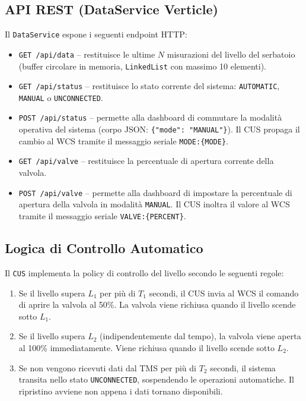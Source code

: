 \documentclass[12pt, a4paper]{article}
\begin{document}
\subsection{API REST (DataService Verticle)}

Il \texttt{DataService} espone i seguenti endpoint HTTP:

\begin{itemize}
    \item \texttt{GET /api/data} -- restituisce le ultime $N$ misurazioni del livello del serbatoio (buffer circolare in memoria, \texttt{LinkedList} con massimo 10 elementi).
    \item \texttt{GET /api/status} -- restituisce lo stato corrente del sistema: \texttt{AUTOMATIC}, \texttt{MANUAL} o \texttt{UNCONNECTED}.
    \item \texttt{POST /api/status} -- permette alla dashboard di commutare la modalità operativa del sistema (corpo JSON: \texttt{\{"mode": "MANUAL"\}}). Il CUS propaga il cambio al WCS tramite il messaggio seriale \texttt{MODE:\{MODE\}}.
    \item \texttt{GET /api/valve} -- restituisce la percentuale di apertura corrente della valvola.
    \item \texttt{POST /api/valve} -- permette alla dashboard di impostare la percentuale di apertura della valvola in modalità \texttt{MANUAL}. Il CUS inoltra il valore al WCS tramite il messaggio seriale \texttt{VALVE:\{PERCENT\}}.
\end{itemize}

\subsection{Logica di Controllo Automatico}

Il \texttt{CUS} implementa la policy di controllo del livello secondo le seguenti regole:

\begin{enumerate}
    \item Se il livello supera $L_1$ per più di $T_1$ secondi, il CUS invia al WCS il comando di aprire la valvola al 50\%. La valvola viene richiusa quando il livello scende sotto $L_1$.
    \item Se il livello supera $L_2$ (indipendentemente dal tempo), la valvola viene aperta al 100\% immediatamente. Viene richiusa quando il livello scende sotto $L_2$.
    \item Se non vengono ricevuti dati dal TMS per più di $T_2$ secondi, il sistema transita nello stato \texttt{UNCONNECTED}, sospendendo le operazioni automatiche. Il ripristino avviene non appena i dati tornano disponibili.
\end{enumerate}
\end{document}
